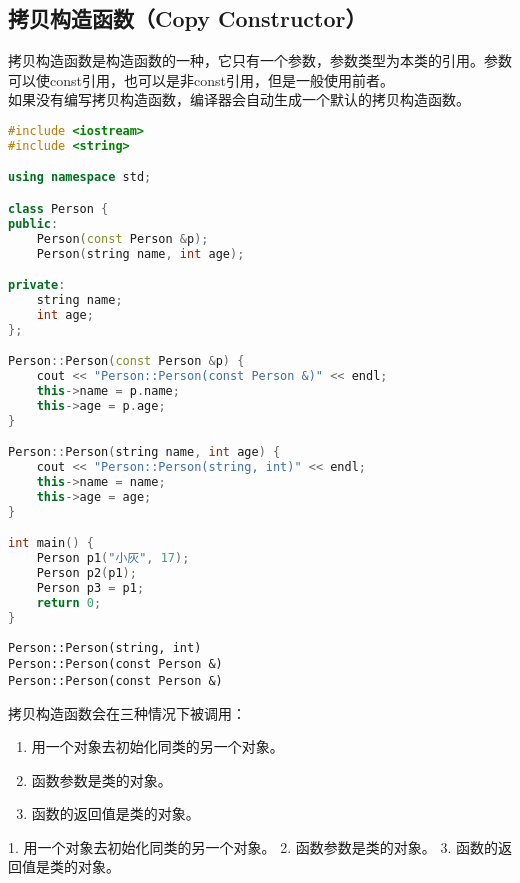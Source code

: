 \subsection{拷贝构造函数（Copy Constructor）}

拷贝构造函数是构造函数的一种，它只有一个参数，参数类型为本类的引用。参数可以使const引用，也可以是非const引用，但是一般使用前者。 \\

如果没有编写拷贝构造函数，编译器会自动生成一个默认的拷贝构造函数。 \\


\begin{lstlisting}[language=C++]
#include <iostream>
#include <string>

using namespace std;

class Person {
public:
    Person(const Person &p);
    Person(string name, int age);

private:
    string name;
    int age;
};

Person::Person(const Person &p) {
    cout << "Person::Person(const Person &)" << endl;
    this->name = p.name;
    this->age = p.age;
}

Person::Person(string name, int age) {
    cout << "Person::Person(string, int)" << endl;
    this->name = name;
    this->age = age;
}

int main() {
    Person p1("小灰", 17);
    Person p2(p1);
    Person p3 = p1;
    return 0;
}
\end{lstlisting}

\begin{tcolorbox}
	\begin{verbatim}
Person::Person(string, int)
Person::Person(const Person &)
Person::Person(const Person &)
	\end{verbatim}
\end{tcolorbox}

拷贝构造函数会在三种情况下被调用：

\begin{enumerate}
	\item 用一个对象去初始化同类的另一个对象。
	\item 函数参数是类的对象。
	\item 函数的返回值是类的对象。
\end{enumerate}

1. 用一个对象去初始化同类的另一个对象。
2. 函数参数是类的对象。
3. 函数的返回值是类的对象。

